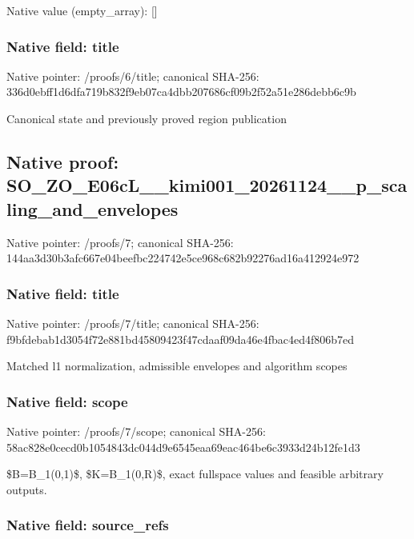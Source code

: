 \documentclass[10pt,a4paper]{article}
\begin{document}
Native value (empty\_array): []



\subsubsection{Native field: title}


Native pointer: /proofs/6/title; canonical SHA-256: 336d0ebff1d6dfa719b832f9\allowbreak{}eb07ca4dbb207686cf09b2f5\allowbreak{}2a51e286debb6c9b


Canonical state and previously proved region publication


\subsection{Native proof: SO\_ZO\_E06cL\_\_kimi001\_202\allowbreak{}61124\_\_p\_scaling\_and\_env\allowbreak{}elopes}


Native pointer: /proofs/7; canonical SHA-256: 144aa3d30b3afc667e04beef\allowbreak{}bc224742e5ce968c682b9227\allowbreak{}6ad16a412924e972



\subsubsection{Native field: title}


Native pointer: /proofs/7/title; canonical SHA-256: f9bfdebab1d3054f72e881bd\allowbreak{}45809423f47cdaaf09da46e4\allowbreak{}fbac4ed4f806b7ed


Matched l1 normalization, admissible envelopes and algorithm scopes


\subsubsection{Native field: scope}


Native pointer: /proofs/7/scope; canonical SHA-256: 58ac828e0cecd0b1054843dc\allowbreak{}044d9e6545eaa69eac464be6\allowbreak{}c3933d24b12fe1d3


\$B=B\_1(0,1)\$, \$K=B\_1(0,R)\$, exact fullspace values and feasible arbitrary outputs.


\subsubsection{Native field: source\_refs}
\end{document}
